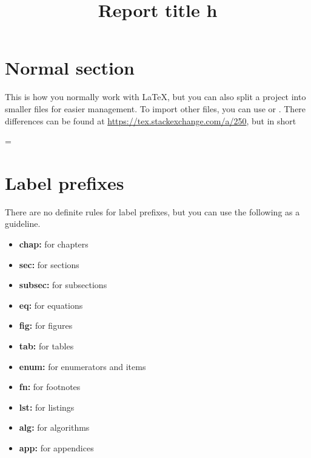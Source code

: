\documentclass[twoside,final]{hcmut-report}
\title{Report title h}
\begin{document}
\coverpage%


\tableofcontents

\clearpage
\section{Normal section}
This is how you normally work with \LaTeX, but you can also split a project into smaller files for easier management.
To import other files, you can use \texttt{} or \texttt{}.
There differences can be found at \url{https://tex.stackexchange.com/a/250}, but in short

\begin{center}
  \texttt{} = \texttt{\clearpage  \clearpage}
\end{center}

\section{Label prefixes}
There are no definite rules for label prefixes, but you can use the following as a guideline.
\begin{itemize}
  \item \textbf{chap:} for chapters
  \item \textbf{sec:} for sections
  \item \textbf{subsec:} for subsections
  \item \textbf{eq:} for equations
  \item \textbf{fig:} for figures
  \item \textbf{tab:} for tables
  \item \textbf{enum:} for enumerators and items
  \item \textbf{fn:} for footnotes
  \item \textbf{lst:} for listings
  \item \textbf{alg:} for algorithms
  \item \textbf{app:} for appendices
\end{itemize}
\end{document}
